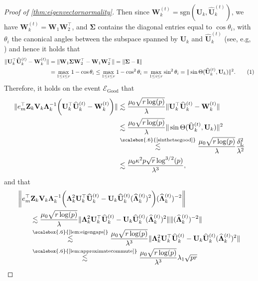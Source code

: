 \documentclass[10pt]{article}
\newcommand{\0}{{\mathbf{0}}}
\newcommand{\1}{{\mathbf{1}}}
\newcommand{\U}{{\mathbf{U}}}
\renewcommand{\citet}{\cite}
\renewcommand{\t}{^{\top}}
\newcommand{\uhat}{\mathbf{\hat{U}}}
\newcommand{\inv}{^{-1}}
\newcommand{\dl}{\delta_{\mathrm{L}}}
\renewcommand{\hat}{\widehat}
\newcommand\numberthis{\addtocounter{equation}{1}\tag{\theequation}}
\renewcommand{\hat}{\widehat}
\begin{document}
\begin{proof}[Proof of \cref{thm:eigenvectornormality}]
{ Then since $\mathbf{W}_k^{(t)} = \mathrm{sgn}(\U_k, \uhat_k^{(t)})$, we have $\mathbf{W}_k^{(t)} = \mathbf{W}_1 \mathbf{W}_2\t$, and $\mathbf{\Sigma}$ contains the diagonal entries equal to $\cos\theta_i$, with $\theta_i$ the canonical angles between the subspace spanned by $\U_k$ and $\uhat_k^{(t)}$ (see, e.g, \citet{kato2013perturbation}) and hence it holds that
\begin{align*}
    \| \U_k\t \uhat_k^{(t)} - \mathbf{W}_k^{(t)} \| &= \| \mathbf{W}_1 \mathbf{\Sigma} \mathbf{W}_2\t - \mathbf{W}_1 \mathbf{W}_2\t \| = \| \mathbf{\Sigma} - \mathbf{I} \| \\
    &= \max_{1\leq i \leq r} 1 - \cos\theta_i \leq \max_{1 \leq i\leq r} 1 - \cos^2 \theta_i = \max_{1\leq i \leq r} \sin^2\theta_i = \| \sin\Theta(\uhat_k^{(t)}, \U_k) \|^2.\numberthis \label{sintheta14}
\end{align*}
}
Therefore, it holds on the event $\mathcal{E}_{\mathrm{Good}}$ that
\begin{align*}
    \| e_m\t \mathbf{Z}_k \mathbf{V}_k \mathbf{\Lambda}_k\inv \bigg( \U_k\t \uhat_k^{(t)} - \mathbf{W}_k^{(t)} \bigg) \| &\lesssim \frac{\mu_0 \sqrt{r\log(p)} }{\lambda} \| \U_k\t \uhat_k^{(t)} - \mathbf{W}_k^{(t)} \| \\
    &\lesssim\frac{\mu_0 \sqrt{r\log(p)} }{\lambda} \| \sin\Theta(\uhat_k^{(t)}, \U_k ) \|^2 \\
    &\overset{\scalebox{.6}{\text{\cref{sinthetaegood}}}}\lesssim \frac{\mu_0 \sqrt{r\log(p)} }{\lambda} \frac{\dl^2}{\lambda^2} \\
    &\lesssim \frac{\mu_0 \kappa^2 p \sqrt{r} \log^{3/2}(p)  }{\lambda^3},
\end{align*}
and that
\begin{align*}
   \bigg\| e_m\t &\mathbf{Z}_k \mathbf{V}_k \mathbf{\Lambda}_k\inv \bigg( \mathbf{\Lambda}_k^2 \U_k\t \uhat_k^{(t)} - \U_k \uhat_k^{(t)} (\mathbf{\hat{\Lambda}}_k^{(t)})^2 \bigg) (\mathbf{\hat{\Lambda}}_k^{(t)})^{-2} \bigg\| \\&\lesssim \frac{\mu_0 \sqrt{r\log(p)} }{\lambda} \| \mathbf{\Lambda}_k^2 \U_k\t \uhat_k^{(t)} - \U_k \uhat_k^{(t)} (\mathbf{\hat{\Lambda}}_k^{(t)})^2 \| \| (\mathbf{\hat{\Lambda}}_k^{(t)})^{-2} \| \\
   &\overset{\scalebox{.6}{\text{\cref{lem:eigengaps}}}}{\lesssim} \frac{\mu_0 \sqrt{r\log(p)} }{\lambda^3} \| \mathbf{\Lambda}_k^2 \U_k\t \uhat_k^{(t)} - \U_k \uhat_k^{(t)} (\mathbf{\hat{\Lambda}}_k^{(t)})^2 \| \\
   &\overset{\scalebox{.6}{\text{\cref{lem:approximatecommute}}}}{\lesssim} \frac{\mu_0 \sqrt{r\log(p)} }{\lambda^3} \lambda_1 \sqrt{pr} \\

\end{align*}
\end{proof}
\end{document}
